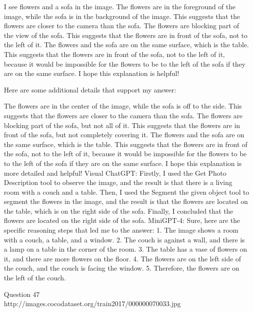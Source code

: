 \begin{enumerate}
    I see flowers and a sofa in the image.
    The flowers are in the foreground of the image, while the sofa is in the background of the image. This suggests that the flowers are closer to the camera than the sofa.
    The flowers are blocking part of the view of the sofa. This suggests that the flowers are in front of the sofa, not to the left of it.
    The flowers and the sofa are on the same surface, which is the table. This suggests that the flowers are in front of the sofa, not to the left of it, because it would be impossible for the flowers to be to the left of the sofa if they are on the same surface.
    I hope this explanation is helpful!
    
    Here are some additional details that support my answer:
    
    The flowers are in the center of the image, while the sofa is off to the side. This suggests that the flowers are closer to the camera than the sofa.
    The flowers are blocking part of the sofa, but not all of it. This suggests that the flowers are in front of the sofa, but not completely covering it.
    The flowers and the sofa are on the same surface, which is the table. This suggests that the flowers are in front of the sofa, not to the left of it, because it would be impossible for the flowers to be to the left of the sofa if they are on the same surface.
    I hope this explanation is more detailed and helpful!
    \subitem Visual ChatGPT: Firstly, I used the Get Photo Description tool to observe the image, and the result is that there is a living room with a couch and a table. Then, I used the Segment the given object tool to segment the flowers in the image, and the result is that the flowers are located on the table, which is on the right side of the sofa. Finally, I concluded that the flowers are located on the right side of the sofa.
    \subitem MiniGPT-4: Sure, here are the specific reasoning steps that led me to the answer:
    1. The image shows a room with a couch, a table, and a window.
    2. The couch is against a wall, and there is a lamp on a table in the corner of the room.
    3. The table has a vase of flowers on it, and there are more flowers on the floor.
    4. The flowers are on the left side of the couch, and the couch is facing the window.
    5. Therefore, the flowers are on the left of the couch.
\end{enumerate}
Question 47\\
http://images.cocodataset.org/train2017/000000070033.jpg
